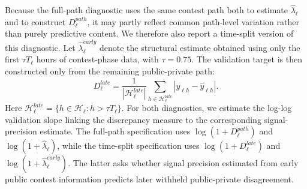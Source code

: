 \documentclass[mnsc]{informs3}
\begin{document}
Because the full-path diagnostic uses the same contest path both to estimate $\hat\lambda_\ell$ and to construct $D_\ell^{path}$, it may partly reflect common path-level variation rather than purely predictive content.
We therefore also report a time-split version of this diagnostic.
Let $\hat\lambda_\ell^{early}$ denote the structural estimate obtained using only the first $\tau T_\ell$ hours of contest-phase data, with $\tau=0.75$.
The validation target is then constructed only from the remaining public-private path:
\[
D_\ell^{late}
=
\frac{1}{|\mathcal H_\ell^{late}|}
\sum_{h\in\mathcal H_\ell^{late}}
\left|y_{\ell h}-\hat y_{\ell h}\right|.
\]
Here $\mathcal H_\ell^{late}=\{h\in\mathcal H_\ell:h>\tau T_\ell\}$.
For both diagnostics, we estimate the log-log validation slope linking the discrepancy measure to the corresponding signal-precision estimate.
The full-path specification uses $\log(1+D_\ell^{path})$ and $\log(1+\hat\lambda_\ell)$, while the time-split specification uses $\log(1+D_\ell^{late})$ and $\log(1+\hat\lambda_\ell^{early})$.
The latter asks whether signal precision estimated from early public contest information predicts later withheld public-private disagreement.
\end{document}
